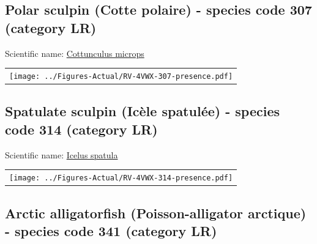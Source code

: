 \documentclass[12pt]{article}\usepackage[]{graphicx}\usepackage[]{color}
\begin{document}
\hypertarget{sec:307}{%
\subsection{Polar sculpin (Cotte polaire) - species code 307 (category LR)}\label{sec:307}}

  


Scientific name: \href{http://www.marinespecies.org/aphia.php?p=taxdetails\&id=127235}{Cottunculus microps} \newline
\begin{minipage}{1.0\textwidth}
 \begin{tabular}{c}
\texttt{[image: ../Figures-Actual/RV-4VWX-307-presence.pdf]} \\ 
\end{tabular} 
\end{minipage}
\clearpage

\renewcommand\thefigure{\thesubsection\Alph{figure}}

\setcounter{figure}{0}

\hypertarget{sec:314}{%
\subsection{Spatulate sculpin (Icèle spatulée) - species code 314 (category LR)}\label{sec:314}}

  


Scientific name: \href{http://www.marinespecies.org/aphia.php?p=taxdetails\&id=127200}{Icelus spatula} \newline
\begin{minipage}{1.0\textwidth}
 \begin{tabular}{c}
\texttt{[image: ../Figures-Actual/RV-4VWX-314-presence.pdf]} \\ 
\end{tabular} 
\end{minipage}
\clearpage

\renewcommand\thefigure{\thesubsection\Alph{figure}}

\setcounter{figure}{0}

\hypertarget{sec:341}{%
\subsection{Arctic alligatorfish (Poisson-alligator arctique) - species code 341 (category LR)}\label{sec:341}}
\end{document}
